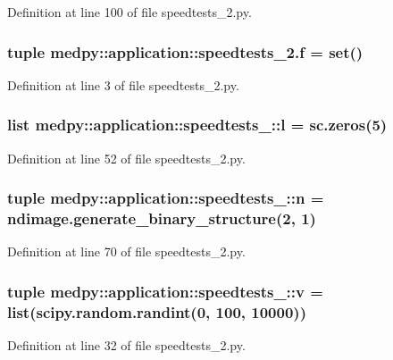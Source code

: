 Definition at line 100 of file speedtests\_\-2.py.

\hypertarget{namespacemedpy_1_1application_1_1speedtests__2_a0a31d91909217760aae9b0c83e2c79f9}{
\subsubsection[{f}]{\setlength{\rightskip}{0pt plus 5cm}tuple {\bf medpy::application::speedtests\_\-2.f} = set()}}
\label{namespacemedpy_1_1application_1_1speedtests__2_a0a31d91909217760aae9b0c83e2c79f9}


Definition at line 3 of file speedtests\_\-2.py.

\hypertarget{namespacemedpy_1_1application_1_1speedtests__2_a4357bcd463b2c880ffbc17090ab777d4}{
\subsubsection[{l}]{\setlength{\rightskip}{0pt plus 5cm}list {\bf medpy::application::speedtests\_::l} = sc.zeros(5)}}
\label{namespacemedpy_1_1application_1_1speedtests__2_a4357bcd463b2c880ffbc17090ab777d4}


Definition at line 52 of file speedtests\_\-2.py.

\hypertarget{namespacemedpy_1_1application_1_1speedtests__2_ad60bd8592e169db611d77aeb7441a26f}{
\subsubsection[{n}]{\setlength{\rightskip}{0pt plus 5cm}tuple {\bf medpy::application::speedtests\_::n} = ndimage.generate\_\-binary\_\-structure(2, 1)}}
\label{namespacemedpy_1_1application_1_1speedtests__2_ad60bd8592e169db611d77aeb7441a26f}


Definition at line 70 of file speedtests\_\-2.py.

\hypertarget{namespacemedpy_1_1application_1_1speedtests__2_ad5ab13c356386ad692ee61da9e5a1541}{
\subsubsection[{v}]{\setlength{\rightskip}{0pt plus 5cm}tuple {\bf medpy::application::speedtests\_::v} = list(scipy.random.randint(0, 100, 10000))}}
\label{namespacemedpy_1_1application_1_1speedtests__2_ad5ab13c356386ad692ee61da9e5a1541}


Definition at line 32 of file speedtests\_\-2.py.

